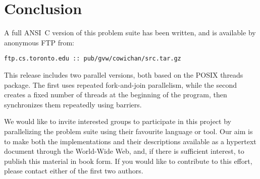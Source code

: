\section{Conclusion\label{s:conclude}}

A full ANSI~C version of this problem suite has been written, and is available by anonymous FTP from:
\begin{center}
{\tt{ftp.cs.toronto.edu :: pub/gvw/cowichan/src.tar.gz}}
\end{center}
This release includes two parallel versions,
both based on the POSIX threads package.
The first uses repeated fork-and-join parallelism,
while the second creates a fixed number of threads at the beginning of the program,
then synchronizes them repeatedly using barriers.

We would like to invite interested groups to participate in this project by parallelizing the problem suite using their favourite language or tool.
Our aim is to make both the implementations and their descriptions available as a hypertext document through the World-Wide Web,
and, if there is sufficient interest, to publish this material in book form.
If you would like to contribute to this effort, please contact either of the first two authors.
